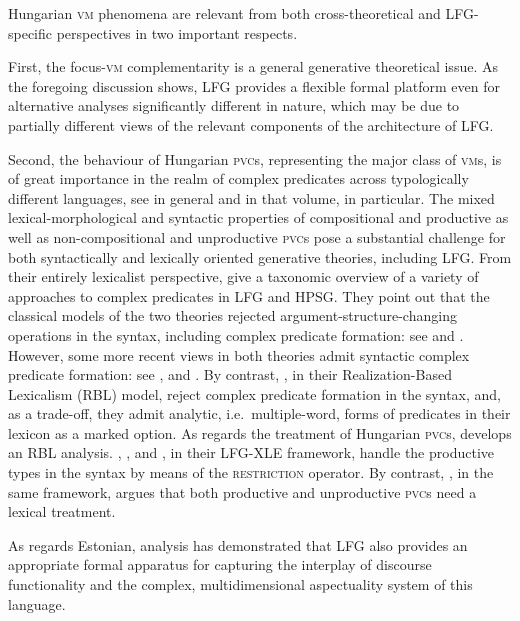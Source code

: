 \documentclass[output=paper,hidelinks]{langscibook}
\begin{document}
Hungarian \textsc{vm} phenomena are relevant from both cross-theoretical and LFG{}-specific perspectives in two important respects.

First, the focus-\textsc{vm} complementarity is a general generative theoretical issue. As the foregoing discussion shows, LFG provides a flexible formal platform even for alternative analyses significantly different in nature, which may be due to partially different views of the relevant components of the architecture of LFG.

Second, the behaviour of Hungarian \textsc{pvc}s, representing the major class of \textsc{vm}s, is of great importance in the realm of complex predicates across typologically different languages, see \citet{AlsinaBresnanSells:ComplexPreds} in general and \citet{AckermanLesourd1997} in that volume, in particular. The mixed lexical-morphological and syntactic properties of compositional and productive as well as non-compositional and unproductive \textsc{pvc}s pose a substantial challenge for both syntactically and lexically oriented generative theories, including LFG.  From their entirely lexicalist perspective, \citet{AckermanStumpWebelhuth2011} give a taxonomic overview of a variety of approaches to complex predicates in LFG and HPSG. They point out that the classical models of the two theories rejected argument-structure-changing operations in the syntax, including complex predicate formation: see \citet{bresnan1982the-passive} and \citet{pollardsag87}. However, some more recent views in both theories admit syntactic complex predicate formation: see \citet{Alsina1992,Alsina1997}, \citet{Butt2003} and \citet{Muller2006}. By contrast, \citet{AckermanStumpWebelhuth2011}, in their Realization-Based Lexicalism (RBL) model, reject complex predicate formation in the syntax, and, as a trade-off, they admit analytic, i.e.\ multiple-word, forms of predicates in their lexicon as a marked option. As regards the treatment of Hungarian \textsc{pvc}s, \citet{Ackerman2003} develops an RBL analysis. \citet{forstetal10}, \citet{LaczkoRakosi2011}, \citet{RakosiLaczko2011} and \citet{LaczkoRakosi2013}, in their LFG-XLE framework, handle the productive types in the syntax by means of the \textsc{restriction} operator. By contrast, \citet{Laczko2013a}, in the same framework, argues that both productive and unproductive \textsc{pvc}s need a lexical treatment.

As regards Estonian,  analysis has demonstrated that LFG also provides an appropriate formal apparatus for capturing the interplay of discourse functionality and the complex, multidimensional aspectuality system of this language.
\end{document}
